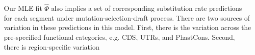 \documentclass[11pt]{article}
\begin{document}
Our MLE fit $\hat{\Phi}$ also implies a set of corresponding substitution rate
predictions for each segment under mutation-selection-draft process. There are
two sources of variation in these predictions in this model. First, there is
the variation across the pre-specified functional categories, e.g. CDS, UTRs,
and PhastCons. Second, there is region-specific variation 











\end{document}
